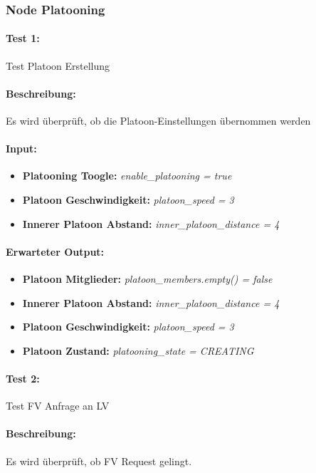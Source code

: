 \documentclass[a4paper, 12pt, titlepage]{scrartcl}
\begin{document}
			\subsubsection{Node Platooning}
			\label{node_platooning}
			\paragraph{Test 1:}{Test Platoon Erstellung}
			\paragraph{Beschreibung:} Es wird überprüft, ob die Platoon-Einstellungen übernommen werden
			\paragraph{Input:}
			\begin{itemize} \itemsep-0.5em
				\item \textbf{Platooning Toogle:} \emph{enable\_platooning = true}
				\item \textbf{Platoon Geschwindigkeit:} \emph{platoon\_speed = 3}
				\item \textbf{Innerer Platoon Abstand:} \emph{inner\_platoon\_distance = 4}
			\end{itemize}
			\paragraph{Erwarteter Output:}
			\begin{itemize} \itemsep-0.5em
				\item \textbf{Platoon Mitglieder:} \emph{platoon\_members.empty() = false}
				\item \textbf{Innerer Platoon Abstand:} \emph{inner\_platoon\_distance = 4}
				\item \textbf{Platoon Geschwindigkeit:} \emph{platoon\_speed = 3}
				\item \textbf{Platoon Zustand:} \emph{platooning\_state = CREATING}
			\end{itemize}
			
			\paragraph{Test 2:}{Test FV Anfrage an LV}
			\paragraph{Beschreibung:} Es wird überprüft, ob FV Request gelingt.
\end{document}
